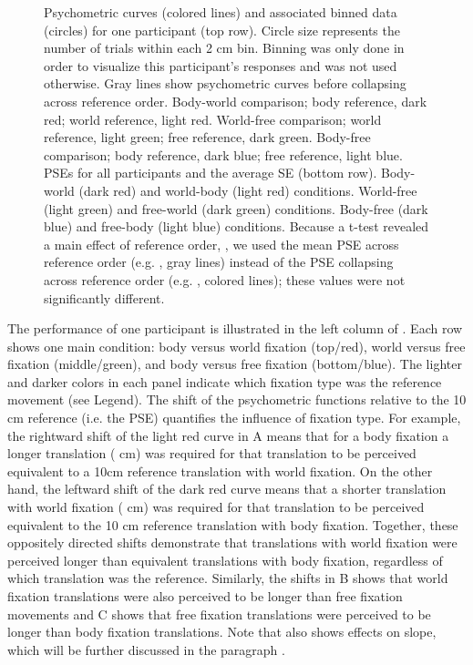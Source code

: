 \begin{figure}
    \caption{Psychometric curves (colored lines) and associated binned data (circles) for one participant (top row). Circle size represents the number of trials within each 2 \si{\centi\metre} bin. Binning was only done in order to visualize this participant's responses and was not used otherwise. Gray lines show psychometric curves before collapsing across reference order.  Body-world comparison; body reference, dark red; world reference, light red.  World-free comparison; world reference, light green; free reference, dark green.   Body-free comparison; body reference, dark blue; free reference, light blue. \newline
PSEs for all participants and the average {\textpm}SE (bottom row).  Body-world (dark red) and world-body (light red) conditions.  World-free (light green) and free-world (dark green) conditions.  Body-free (dark blue) and free-body (light blue) conditions. Because a t-test revealed a main effect of reference order, , we used the mean PSE across reference order (e.g. , gray lines) instead of the PSE collapsing across reference order (e.g. , colored lines); these values were not significantly different.}
    \label{p3:fig2}
\end{figure}

The performance of one participant is illustrated in the left column of . Each row shows one main condition: body versus world fixation (top/red), world versus free fixation (middle/green), and body versus free fixation (bottom/blue). The lighter and darker colors in each panel indicate which fixation type was the reference movement (see Legend). The shift of the psychometric functions relative to the 10 \si{\centi\metre} reference (i.e. the PSE) quantifies the influence of fixation type. For example, the rightward shift of the light red curve in A means that for a body fixation a longer translation ( \si{\centi\metre}) was required for that translation to be perceived equivalent to a 10\si{\centi\metre} reference translation with world fixation. On the other hand, the leftward shift of the dark red curve means that a shorter translation with world fixation ( \si{\centi\metre}) was required for that translation to be perceived equivalent to the 10 \si{\centi\metre} reference translation with body fixation. Together, these oppositely directed shifts demonstrate that translations with world fixation were perceived longer than equivalent translations with body fixation, regardless of which translation was the reference.  Similarly, the shifts in B shows that world fixation translations were also perceived to be longer than free fixation movements and C shows that free fixation translations were perceived to be longer than body fixation translations. Note that  also shows effects on slope, which will be further discussed in the paragraph .


